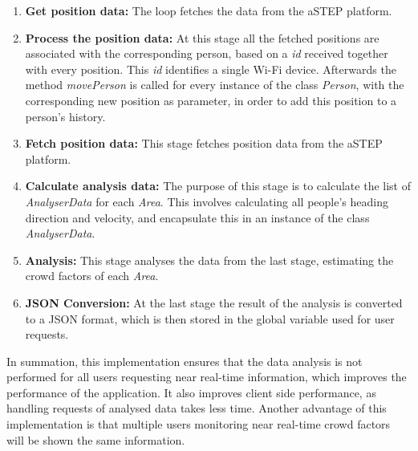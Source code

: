\begin{enumerate}
	\item \textbf{Get position data:} The loop fetches the data from the aSTEP platform.
    \item \textbf{Process the position data:} At this stage all the fetched positions are associated with the corresponding person, based on a \emph{id} received together with every position. This \emph{id} identifies a single Wi-Fi device. Afterwards the method \emph{movePerson} is called for every instance of the class \emph{Person}, with the corresponding new position as parameter, in order to add this position to a person's history.
    \item \textbf{Fetch position data:} This stage fetches position data from the aSTEP platform.
    \item \textbf{Calculate analysis data:} The purpose of this stage is to calculate the list of \emph{AnalyserData} for each \emph{Area}. This involves calculating all people's heading direction and velocity, and encapsulate this in an instance of the class \emph{AnalyserData}.
    \item \textbf{Analysis:} This stage analyses the data from the last stage, estimating the crowd factors of each \emph{Area}.
    \item \textbf{JSON Conversion:} At the last stage the result of the analysis is converted to a JSON format, which is then stored in the global variable used for user requests.
\end{enumerate}

In summation, this implementation ensures that the data analysis is not performed for all users requesting near real-time information, which improves the performance of the application. It also improves client side performance, as handling requests of analysed data takes less time. Another advantage of this implementation is that multiple users monitoring near real-time crowd factors will be shown the same information.